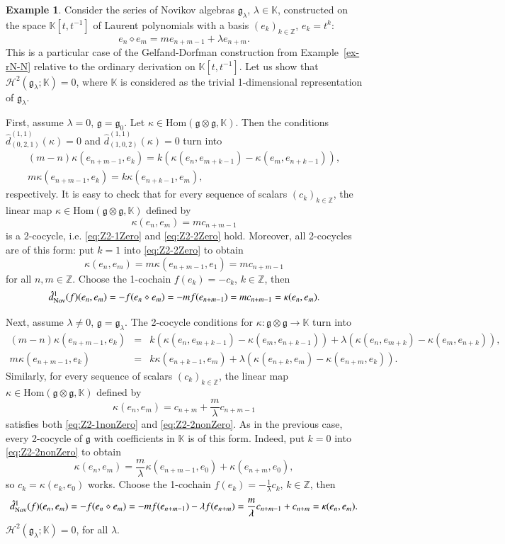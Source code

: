 \documentclass[12pt]{amsart}
\theoremstyle{definition}
\newtheorem{ex}[thm]{Example}
\newcommand{\g}{\mathfrak g}
\newcommand{\huaH}{\mathcal{H}}
\newcommand{\Hom}{\mathrm{Hom}}
\newcommand{\K}{\mathbb{K}}
\newcommand{\nov}{{\rm Nov}}
\begin{document}
\begin{ex}\label{exmp:Polynomial}
Consider the series of Novikov algebras
$\g_\lambda $, $\lambda \in \mathds K$, constructed on the
 space $\mathds K[t,t^{-1}]$ of Laurent polynomials  with a basis $(e_k)_{k\in \mathds Z}$, $e_k=t^k$:
\[
e_n\diamond e_m = me_{n+m-1} + \lambda e_{n+m}.
\]
This is a particular case of the Gelfand-Dorfman construction from Example~\ref{ex-rN-N} relative to the ordinary derivation on $\mathds K[t,t^{-1}]$.
Let us show that $\huaH^2(\g_\lambda;\mathds K)=0$, where $\mathds K$
is considered as the trivial 1-dimensional representation of $\g_\lambda$.



First, assume $\lambda =0$, $\g=\g_0$.
Let $\kappa\in\Hom(\g\otimes\g,\K) $.
Then the conditions
$\hat d^{(1,1)}_{(0,2,1)}(\kappa)=0$
and
$\hat d^{(1,1)}_{(1,0,2)}(\kappa)=0$
turn into
\begin{gather}
    (m-n)\kappa(e_{n+m-1}, e_k) = k(\kappa (e_n, e_{m+k-1}) - \kappa(e_m, e_{n+k-1})), \label{eq:Z2-1Zero} \\
m\kappa(e_{n+m-1}, e_k) = k \kappa (e_{n+k-1}, e_m),
 \label{eq:Z2-2Zero}
\end{gather}
respectively.
It is easy to check that
for every sequence of scalars $(c_k)_{k\in \mathds Z}$,
the linear map $\kappa\in\Hom(\g\otimes\g,\K)$ defined by
$$ \kappa(e_n, e_m)= m c_{n+m-1}$$
is a 2-cocycle, i.e.
\eqref{eq:Z2-1Zero} and \eqref{eq:Z2-2Zero} hold.
Moreover, all 2-cocycles are of this form:
put $k=1$ into \eqref{eq:Z2-2Zero} to obtain
\[
\kappa(e_n,e_m) = m \kappa(e_{n+m-1}, e_1) = m c_{n+m-1}
\]
for all $n,m\in \mathds Z$.
Choose the 1-cochain $f(e_k) = -c_k$, $k\in \mathds Z$,
then
\[
\hat d^1_{\nov}(f)(e_n,e_m) = - f(e_n\diamond e_m) = -m f(e_{n+m-1}) = m c_{n+m-1} = \kappa(e_n,e_m).
\]

Next, assume $\lambda \ne 0$, $\g=\g_\lambda $.
The 2-cocycle conditions for $\kappa:\g\otimes \g\to \mathds K$
turn into
\begin{eqnarray}
    (m-n)\kappa(e_{n+m-1}, e_k) &=& k(\kappa (e_n, e_{m+k-1}) - \kappa(e_m, e_{n+k-1})) +\lambda (\kappa(e_n, e_{m+k})-\kappa(e_m,e_{n+k})), \label{eq:Z2-1nonZero} \\
m\kappa(e_{n+m-1}, e_k) &=& k \kappa (e_{n+k-1}, e_m) +\lambda(\kappa(e_{n+k},e_m)-\kappa(e_{n+m},e_k)).
 \label{eq:Z2-2nonZero}
\end{eqnarray}
Similarly, for every sequence of scalars $(c_k)_{k\in \mathds Z}$,
the linear map $\kappa\in\Hom(\g\otimes\g,\K)$ defined by
\[\kappa( e_n,e_m) = c_{n+m} + \frac{m}{\lambda}c_{n+m-1}
\]
satisfies both \eqref{eq:Z2-1nonZero} and \eqref{eq:Z2-2nonZero}.
As in the previous case, every 2-cocycle of $\g$ with coefficients in $\mathds K$ is of this form. Indeed,
put $k=0$ into \eqref{eq:Z2-2nonZero} to obtain
\[
\kappa(e_n,e_m) = \frac{m}{\lambda} \kappa(e_{n+m-1}, e_0) +\kappa(e_{n+m}, e_0),
\]
so $c_k = \kappa(e_k,e_0)$ works.
Choose the 1-cochain $f(e_k) = -\frac{1}{\lambda} c_k$, $k\in \mathds Z$,
then
\[
\hat d^1_{\nov}(f)(e_n,e_m) = - f(e_n\diamond e_m) = -m f(e_{n+m-1})-\lambda f(e_{n+m}) = \frac{m}{\lambda} c_{n+m-1} + c_{n+m}= \kappa(e_n,e_m).
\]
 $\huaH^2(\g_\lambda;\mathds K)=0$, for all $\lambda.$
\end{ex}
\end{document}

